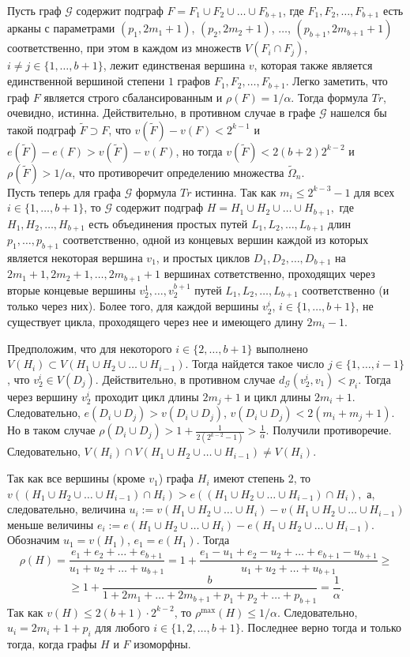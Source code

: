 \documentclass[12pt,a4paper,russian,titlepage]{article}
\begin{document}
Пусть граф $\mathcal{G}$ содержит подграф $F = F_1\cup F_2\cup\ldots\cup F_{b+1}$, где $F_1, F_2,\ldots, F_{b+1}$ есть арканы с параметрами $(p_1,2m_1+1)$, $(p_2,2m_2+1)$, $\ldots$, $(p_{b+1},2m_{b+1}+1)$ соответственно, при этом в каждом из множеств $V(F_i \cap F_j)$, $i\neq j \in \{1, \ldots ,b+1\}$, лежит единственая вершина $v$, которая также является единственной вершиной степени $1$ графов $F_1,F_2,\ldots,F_{b+1}$. Легко заметить, что граф $F$ является строго сбалансированным и $\rho(F)=1/\alpha$. Тогда формула $Tr$, очевидно, истинна. Действительно, в противном случае в графе $\mathcal{G}$ нашелся бы такой подграф $\tilde F\supset F$, что $v(\tilde F)-v(F)<2^{k-1}$ и $e(\tilde F)-e(F)>v(\tilde F)-v(F)$, но тогда $v(\tilde F)<2(b+2)2^{k-2}$ и $\rho(\tilde F)>1/\alpha$, что противоречит определению множества $\tilde\Omega_n$.\\

Пусть теперь для графа $\mathcal G$ формула $Tr$ истинна. Так как
$m_i\leq 2^{k-3}-1$ для всех $i\in\{1,\ldots,b+1\}$, то $\mathcal{G}$ содержит подграф $H = H_1 \cup H_2 \cup \ldots \cup H_{b+1},$ где $H_1, H_2, \ldots, H_{b+1}$ есть объединения простых путей $L_1,L_2,\ldots,L_{b+1}$ длин $p_1,\ldots,p_{b+1}$ соответственно, одной из концевых вершин каждой из которых является некоторая вершина $v_1$, и простых циклов $D_1,D_2,\ldots,D_{b+1}$ на $2m_1+1,2m_2+1,\ldots,2m_{b+1}+1$ вершинах сответственно, проходящих через вторые концевые вершины $v_2^1,\ldots,v_2^{b+1}$ путей $L_1,L_2,\ldots,L_{b+1}$ соответственно (и только через них). Более того, для каждой вершины $v_2^i$, $i\in\{1,\ldots,b+1\}$, не существует цикла, проходящего через нее и имеющего длину $2m_i-1$.


Предположим, что для некоторого $i\in\{2,\ldots,b+1\}$ выполнено  $V(H_i)\subset V(H_1\cup H_2\cup\ldots\cup H_{i-1})$. Тогда найдется такое число $j\in\{1,\ldots,i-1\}$, что $v_2^i\in V(D_j)$. Действительно, в противном случае $d_{\mathcal{G}}(v_2^i,v_1)<p_i$. Тогда через вершину $v_2^i$ проходит цикл длины $2m_j+1$ и цикл длины $2m_i+1$. Следовательно, $e(D_i\cup D_j)> v(D_i\cup D_j)$, $v(D_i\cup D_j)<2(m_i+m_j+1)$. Но в таком случае $\rho(D_i\cup D_j)>1+\frac{1}{2(2^{k-2}-1)}>\frac{1}{\alpha}$. Получили противоречие.  
Следовательно, $V(H_i)\cap V(H_1\cup H_2\cup\ldots\cup H_{i-1})\neq V(H_i)$. 

Так как все вершины (кроме $v_1$) графа $H_i$ имеют степень $2$, то
$v((H_1\cup H_2\cup\ldots\cup H_{i-1})\cap H_i)> e((H_1\cup H_2\cup\ldots\cup H_{i-1})\cap H_i),$
а, следовательно, величина $u_i:=v(H_1\cup H_2\cup\ldots\cup H_i)-v(H_1\cup H_2\cup\ldots\cup H_{i-1})$
меньше величины $e_i:=e(H_1\cup H_2\cup\ldots\cup H_i)-e(H_1\cup H_2\cup\ldots\cup H_{i-1}).$
Обозначим $u_1=v(H_1)$, $e_1=e(H_1)$. Тогда
$$
 \rho(H)=\frac{e_1+e_2+\ldots+e_{b+1}}{u_1+u_2+\ldots+u_{b+1}}=1+\frac{e_1-u_1+e_2-u_2+\ldots+
 e_{b+1}-u_{b+1}}{u_1+u_2+\ldots+u_{b+1}}\geq
$$
$$
  \geq 1+\frac{b}{1+2m_1+\ldots+2m_{b+1}+p_1+p_2+\ldots+p_{b+1}}=\frac{1}{\alpha}.
$$
Так как $v(H)\leq 2(b+1)\cdot 2^{k-2}$, то $\rho^{\max}(H) \leq 1/\alpha.$ Следовательно, $u_i=2m_i+1+p_i$ для любого $i\in\{1,2,\ldots,b+1\}$. Последнее верно тогда и только тогда, когда графы $H$ и $F$ изоморфны.\\
\end{document}
